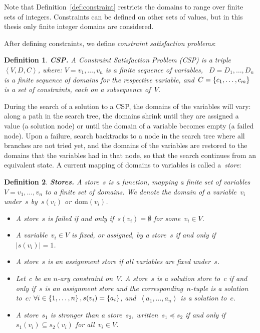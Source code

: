\documentclass[a4paper,11pt]{article}
\newtheorem{definition}{Definition}
\newcommand{\Dom}[1]{\text{dom}({#1})}
\numberwithin{equation}{section}
\begin{document}
Note that Definition~\ref{def:constraint} restricts the domains to range
over finite sets of integers. Constraints can be defined on
other sets of values, but in this thesis only finite integer domains
are considered.

After defining constraints, we define \emph{constraint satisfaction problems}:

\begin{definition}
  \textbf{CSP.} A Constraint Satisfaction Problem (CSP) is a 
  triple~$\left<V,D,C\right>$, where:
  $V = v_1, \ldots, v_n$ is a finite sequence of variables,
  ~$D = D_1, \ldots, D_n$ is a finite sequence of domains for the respective variable,
  and~$C = \left\{c_1, \ldots, c_m\right\}$ is a set of constraints, each on a subsequence of~$V$.
\end{definition}

During the search of a solution to a CSP, the domains of the variables will vary: 
along a path in the search tree, the domains shrink
until they are assigned a value (a solution node) or until the domain
of a variable becomes empty (a failed node).
Upon a failure, search backtracks to a node in the search tree
where all branches are not tried yet,
and the domains of the variables are restored to the domains that the variables
had in that node, so that the search continues from an equivalent state.
A current mapping of domains to variables is called a~\emph{store}:

\begin{definition}
  \textbf{Stores.} A \emph{store}~$s$ is a function, mapping a finite set of
  variables~$V = v_1, \ldots, v_n$ to a finite set of domains. We denote the domain of
  a variable~$v_i$ under~$s$ by~$s(v_i)$ or~$\Dom{v_i}$.
  \begin{itemize}
    \item A store~$s$ is \emph{failed} if and only if~$s(v_i) = \emptyset$ for some~$v_i \in V$.
    \item   A variable~$v_i \in V$ is \emph{fixed}, or \emph{assigned},
      by a store~$s$ if and only if~$|s(v_i)| = 1$. 
    \item A store~$s$ is an \emph{assignment} store if all variables are 
      fixed under~$s$.

    \item Let~$c$ be an $n$-ary constraint on~$V$. A store~$s$ is 
      a \emph{solution store} 
      to~$c$ if and only if~$s$ is an assignment store and the
      corresponding~$n$-tuple is a solution to~$c$:
      $\forall i \in \left\{1,\ldots,n\right\}, s(v_i) = \left\{a_i\right\}$,
      and~$\left<a_1,\ldots,a_n\right>$ is a solution to~$c$.

    \item A store~$s_1$ is \emph{stronger} than a store~$s_2$, 
      written~$s_1 \preceq s_2$ if and only if~$s_1(v_i) \subseteq s_2(v_i)$ 
      for all~$v_i \in V$.
  \end{itemize}

\end{definition}
\end{document}
